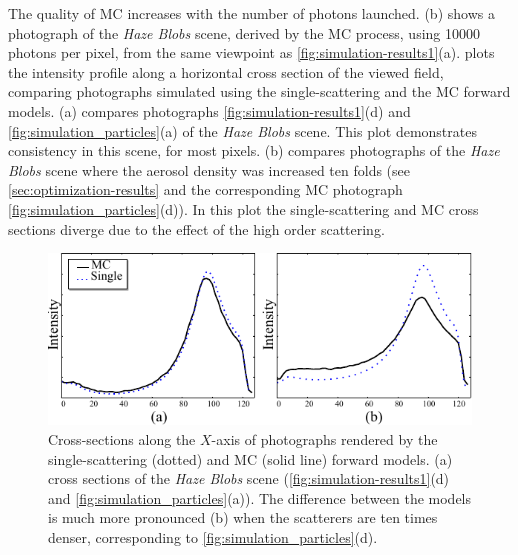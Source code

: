 \documentclass[10pt,letterpaper]{article}
\newcommand{\yoavcomment}[1]{}
\renewcommand{\yoavcomment}[1]{#1} %
\begin{document}
The quality of MC increases with the number of photons launched.
(b) shows a photograph of the {\em Haze Blobs}
scene, derived by the MC process, using \num{10000} photons per pixel,
from the same viewpoint as \cref{fig:simulation-results1}(a).
 plots the intensity profile
along a horizontal cross section of the viewed field,
comparing photographs simulated using the single-scattering and the  MC forward models.
(a) compares photographs \cref{fig:simulation-results1}(d)
and \cref{fig:simulation_particles}(a) of the {\em Haze Blobs} scene.
This plot demonstrates consistency in this scene, for most pixels.
(b) compares photographs of the {\em Haze Blobs} scene
where the aerosol density was increased ten folds (see \cref{sec:optimization-results}
and the corresponding MC photograph \cref{fig:simulation_particles}(d)).
In this plot the single-scattering and MC cross sections diverge
due to the effect of the high order scattering.
\begin{figure}[t]
  \centering
  \yoavcomment{\includegraphics{images/cross_sections.pdf}}
  \caption{\small Cross-sections along the $X$-axis of photographs rendered
    by the single-scattering (dotted) and MC (solid line) forward models.
    (a) cross sections of the {\em Haze Blobs} scene (\cref{fig:simulation-results1}(d)
    and \cref{fig:simulation_particles}(a)). The difference between the models is much more pronounced (b) 
    when the scatterers are ten times denser, corresponding to \cref{fig:simulation_particles}(d).
  }
  \label{fig:cross_sections}
\end{figure}
\end{document}
